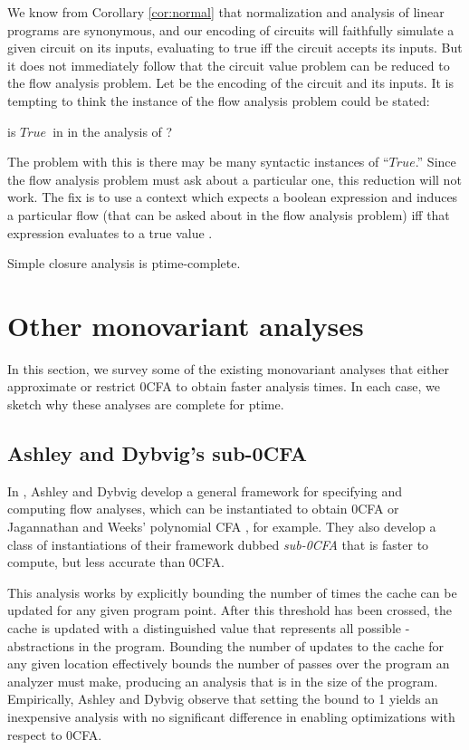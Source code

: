 \documentclass{llncs}
\newcommand\True{\ensuremath{\mathit{True}}}
\newcommand\ptime{{\sc ptime}}
\begin{document}
We know from Corollary \ref{cor:normal} that normalization and
analysis of linear programs are synonymous, and our encoding of
circuits will faithfully simulate a given circuit on its inputs,
evaluating to true iff the circuit accepts its inputs.  But it does
not immediately follow that the circuit value problem can be reduced
to the flow analysis problem.  Let  be the encoding of
the circuit and its inputs.  It is tempting to think the instance of
the flow analysis problem could be stated:
\begin{center}
is \True\ in  in the analysis
of ?
\end{center}
The problem with this is there may be many syntactic instances of
``\True.''  Since the flow analysis problem must ask about a particular
one, this reduction will not work.  The fix is to use a context which
expects a boolean expression and induces a particular flow (that can
be asked about in the flow analysis problem) iff that expression
evaluates to a true value \cite{vanhorn-mairson-07}.

\begin{corollary}
Simple closure analysis is \ptime-complete.
\end{corollary}

\section{Other monovariant analyses}

In this section, we survey some of the existing monovariant analyses
that either approximate or restrict 0CFA to obtain faster analysis
times.  In each case, we sketch why these analyses are complete for
\ptime.

\subsection{Ashley and Dybvig's sub-0CFA}
\label{sec:sub0}

In \cite{ashley-dybvig}, Ashley and Dybvig develop a general framework
for specifying and computing flow analyses, which can be instantiated
to obtain 0CFA or Jagannathan and Weeks' polynomial CFA
\cite{jagannathan-weeks-95}, for example.  They also develop a class
of instantiations of their framework dubbed {\em sub-0CFA} that is
faster to compute, but less accurate than 0CFA.

This analysis works by explicitly bounding the number of times the
cache can be updated for any given program point.  After this
threshold has been crossed, the cache is updated with a distinguished
 value that represents all possible -abstractions
in the program.  Bounding the number of updates to the cache for any
given location effectively bounds the number of passes over the
program an analyzer must make, producing an analysis that is  in
the size of the program.  Empirically, Ashley and Dybvig observe that
setting the bound to 1 yields an inexpensive analysis with no
significant difference in enabling optimizations with respect to 0CFA.
\end{document}
